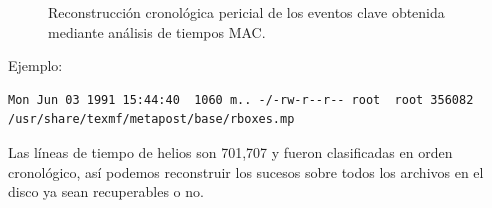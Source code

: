 \begin{figure}[htbp]
\caption{Reconstrucción cronológica pericial de los eventos clave obtenida mediante análisis de tiempos MAC.}
\label{fig:cronologia_mactime}
\end{figure}

Ejemplo:
 
\vspace{1em}

{\footnotesize
\begin{lstlisting}[style=terminal]
Mon Jun 03 1991 15:44:40  1060 m.. -/-rw-r--r-- root  root 356082 /usr/share/texmf/metapost/base/rboxes.mp
\end{lstlisting}
}

\vspace{1em}

 Las líneas de tiempo de helios son 701,707 y fueron clasificadas en
orden cronológico, así podemos reconstruir los sucesos sobre todos los
archivos en el disco ya sean recuperables o no.

\vspace{1em}

